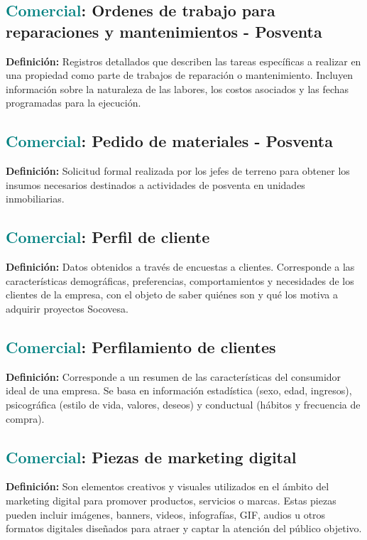\documentclass[12pt]{article}
\begin{document}
\subsection{\textcolor{teal}{Comercial}: Ordenes de trabajo para reparaciones y mantenimientos - Posventa}
\textbf{Definición:} Registros detallados que describen las tareas específicas a realizar en una propiedad como parte de trabajos de reparación o mantenimiento. Incluyen información sobre la naturaleza de las labores, los costos asociados y las fechas programadas para la ejecución.
\subsection{\textcolor{teal}{Comercial}: Pedido de materiales - Posventa}
\textbf{Definición:} Solicitud formal realizada por los jefes de terreno para obtener los insumos necesarios destinados a actividades de posventa en unidades inmobiliarias. 
\subsection{\textcolor{teal}{Comercial}: Perfil de cliente}
\textbf{Definición:} Datos obtenidos a través de encuestas a clientes. Corresponde a las características demográficas, preferencias, comportamientos y necesidades de los clientes de la empresa, con el objeto de saber quiénes son y qué los motiva a adquirir proyectos Socovesa.
\subsection{\textcolor{teal}{Comercial}: Perfilamiento de clientes}
\textbf{Definición:} Corresponde a un resumen de las características del consumidor ideal de una empresa. Se basa en información estadística (sexo, edad, ingresos), psicográfica (estilo de vida, valores, deseos) y conductual (hábitos y frecuencia de compra).
\subsection{\textcolor{teal}{Comercial}: Piezas de marketing digital}
\textbf{Definición:} Son elementos creativos y visuales utilizados en el ámbito del marketing digital para promover productos, servicios o marcas. Estas piezas pueden incluir imágenes, banners, videos, infografías, GIF, audios u otros formatos digitales diseñados para atraer y captar la atención del público objetivo.
\end{document}

